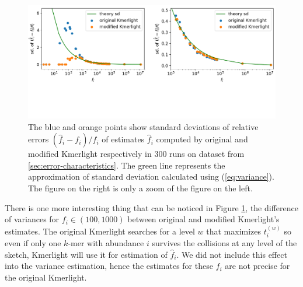\begin{figure}[h]
\centerline{\includegraphics[width=1\textwidth, trim={0cm, 3.8cm, 0cm, 0cm}, clip]{images/std_deviations_comparison_theory2.png}}
\caption[Experimental and theoretical variance of Kmerlight]{The blue and orange points show 
standard deviations of relative errors $(\hat f_i - f_i) / f_i$ of estimates $\hat f_i$
computed by original and modified Kmerlight respectively in 300 runs on dataset from 
\ref{sec:error-characteristics}. The green line represents the approximation of standard
deviation calculated using (\ref{eq:variance}). The figure on the right is only a zoom of the figure
on the left.}
\label{img:std-theory}
\end{figure}

There is one more interesting thing that can be noticed in Figure \ref{img:std-theory},
the difference of variances for $f_i \in (100, 1000)$ between original and modified Kmerlight's
estimates. The original Kmerlight searches for a level $w$ that maximizes $t_i^{(w)}$ so
even if only one $k$-mer with abundance $i$ survives the collisions at any level of the sketch, 
Kmerlight will use it for estimation of $\hat f_i$. We did not include this effect into the
variance estimation, hence the estimates for these $f_i$ are not precise for the original Kmerlight.
